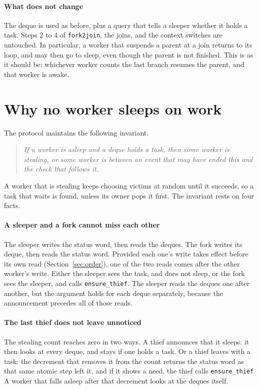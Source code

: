 \documentclass[sigplan,nonacm]{acmart}
\begin{document}
\paragraph{What does not change}
%
The deque is used as before, plus a query that tells a sleeper whether
it holds a task.
%
Steps 2 to 4 of \lstinline|fork2join|, the joins, and the context
switches are untouched.
%
In particular, a worker that suspends a parent at a join returns to its
loop, and may then go to sleep, even though the parent is not finished.
%
This is as it should be: whichever worker counts the last branch
resumes the parent, and that worker is awake.

\section{Why no worker sleeps on work}
\label{sec:safety}

The protocol maintains the following invariant.

\begin{quote}
\emph{If a worker is asleep and a deque holds a task, then some worker
is stealing, or some worker is between an event that may have ended
this and the check that follows it.}
\end{quote}

A worker that is stealing keeps choosing victims at random until it
succeeds, so a task that waits is found, unless its owner pops it
first.
%
The invariant rests on four facts.

\paragraph{A sleeper and a fork cannot miss each other}
%
The sleeper writes the status word, then reads the deques.
%
The fork writes its deque, then reads the status word.
%
Provided each one's write takes effect before its own read
(Section~\ref{sec:order}), one of the two reads comes after the other
worker's write.
%
Either the sleeper sees the task, and does not sleep, or the fork sees
the sleeper, and calls \lstinline|ensure_thief|.
%
The sleeper reads the deques one after another, but the argument holds
for each deque separately, because the announcement precedes all of
those reads.

\paragraph{The last thief does not leave unnoticed}
%
The stealing count reaches zero in two ways.
%
A thief announces that it sleeps: it then looks at every deque, and
stays if one holds a task.
%
Or a thief leaves with a task: the decrement that removes it from the
count returns the status word as that same atomic step left it, and if
it shows a need, the thief calls \lstinline|ensure_thief|.
%
A worker that falls asleep after that decrement looks at the deques
itself.
\end{document}
